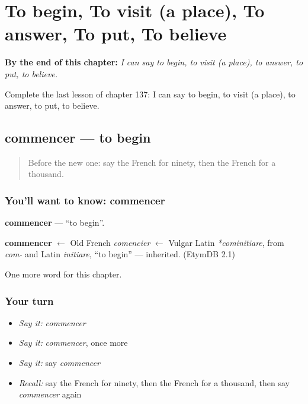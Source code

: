 
\chapter{To begin, To visit (a place), To answer, To put, To believe}
\label{ch:fr-to-begin-to-visit-a-place-to-answer-to-put-to-believe}

\begin{chapteropening}
\textbf{By the end of this chapter:} \emph{I can say to begin, to visit (a place), to answer, to put, to believe.}

Complete the last lesson of chapter 137: I can say to begin, to visit (a place), to answer, to put, to believe.
\end{chapteropening}

\section[commencer]{commencer — to begin}

\label{lesson:FR-C137-commencer}



\begin{quote}
Before the new one: say the French for ninety, then the French for a thousand.
\end{quote}

\subsection*{You'll want to know: commencer}
\textbf{commencer} — \textquotedblleft{}to begin\textquotedblright{}.

\begin{cousinweb}
\textbf{commencer} $\leftarrow$ Old French \emph{comencier} $\leftarrow$ Vulgar Latin \emph{*cominitiare}, from \emph{com-} and Latin \emph{initiare}, \textquotedblleft{}to begin\textquotedblright{} — inherited. (EtymDB 2.1)
\end{cousinweb}

\begin{grammarlens}[title={What you've built}]
One more word for this chapter.
\end{grammarlens}

\subsection*{Your turn}
\begin{itemize}
\raggedright
  \item \emph{Say it:} \emph{commencer}
  \item \emph{Say it:} \emph{commencer}, once more
  \item \emph{Say it:} say \emph{commencer}
  \item \emph{Recall:} say the French for ninety, then the French for a thousand, then say \emph{commencer} again
\end{itemize}

